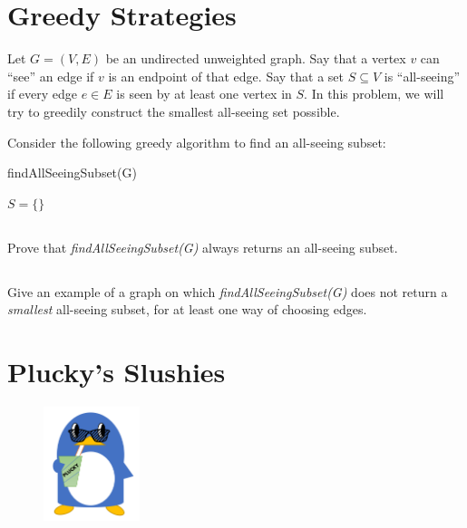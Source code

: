 \documentclass [12pt]{article}
\begin{document}
\section{Greedy Strategies } 
Let $G = (V, E)$ be an undirected unweighted graph. Say that a vertex $v$ can ``see'' an edge if $v$ is an endpoint of that edge. Say that a set $S \subseteq V$ is ``all-seeing'' if every edge $e \in E$ is seen by at least one vertex in $S$. In this problem, we will try to greedily construct the smallest all-seeing set possible. 

Consider the following greedy algorithm to find an all-seeing subset:

\begin{algorithm}[H] 
\caption{findAllSeeingSubset(G)} 
\begin{algorithmic}
  \State $S = \{\}$ 
  \State {} 
  \State {}
\end{algorithmic}
\end{algorithm} 

\subsection{} 
Prove that \emph{findAllSeeingSubset(G)} always returns an all-seeing subset. 


\subsection{} Give an example of a graph on which \emph{findAllSeeingSubset(G)} does not return a \textit{smallest} all-seeing subset, for at least one way of choosing edges. 



\section{Plucky's Slushies } 
\begin{figure} 
\centering 
\includegraphics[width=0.25\textwidth]{plucky.png} 
\end{figure} 
\end{document}

